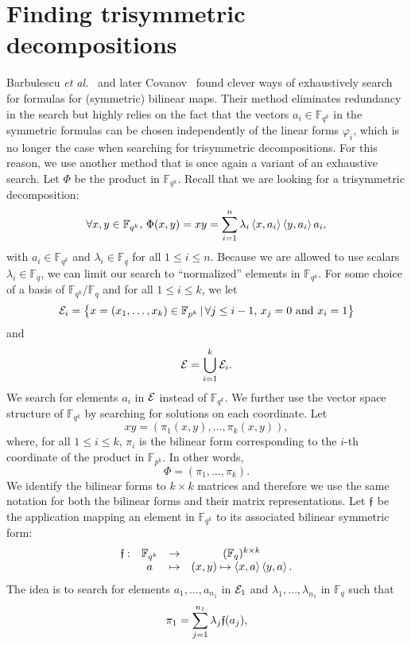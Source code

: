 \documentclass[11pt]{article}
\begin{document}
\section{Finding trisymmetric decompositions}
\label{sec:algos}
Barbulescu \emph{et al.}~\cite{BDEZ12} and later Covanov~\cite{Covanov19} found
clever ways of exhaustively search for formulas for (symmetric) bilinear maps.
Their method eliminates redundancy in the search but highly
relies on the fact that the vectors $a_i\in\mathbb{F}_{q^k}$ in%
the symmetric formulas
can be chosen independently of
the linear forms $\varphi_i$, which is no longer
the case when searching for trisymmetric decompositions. For this reason, we
use another method that is once again a variant of an exhaustive search. Let
$\Phi$ be the product in $\mathbb{F}_{q^k}$. Recall
that we are looking for a trisymmetric decomposition:
\[
  \forall x, y\in\mathbb{F}_{q^k},\,\Phi(x, y) = xy =
  \sum_{i=1}^{n}\lambda_i\left\langle x,a_i\right\rangle\left\langle y,a_i\right\rangle a_i,
\]
with $a_i\in\mathbb{F}_{q^k}$ and $\lambda_i\in\mathbb{F}_q$ for all $1\leq i
\leq n$. Because we are allowed to use scalars $\lambda_i\in\mathbb{F}_q$, we
can limit our search to ``normalized'' elements in $\mathbb{F}_{q^k}$. For some
choice of a basis of $\mathbb{F}_{q^k}/\mathbb{F}_q$ and for all
$1\leq i\leq k$, we let
\[
  \mathcal{E}_i=\left\{ x=(x_1, \dots, x_k)\in\mathbb{F}_{p^k}
  \,|\, \forall j\leq i-1,\,x_j=0\text{ and }x_i=1 \right\}
\]
and
\[
  \mathcal{E} = \bigcup_{i=1}^k\mathcal{E}_i.
\]
We search for elements $a_i$ in $\mathcal{E}$ instead of $\mathbb{F}_{q^k}$. We further
use the vector space structure of $\mathbb{F}_{q^k}$ by searching for solutions
on each coordinate.
Let 
\[
  xy = (\pi_1(x, y), \dots, \pi_k(x, y)),
\]
where, for all $1\leq i\leq k$, $\pi_i$ is the bilinear form corresponding to
the $i$-th coordinate of the product in $\mathbb{F}_{p^k}$. In other words, 
\[
  \Phi = (\pi_1, \dots, \pi_k).
\]
We identify the
bilinear forms to $k\times k$ matrices and therefore we use the same notation for both the
bilinear forms and their matrix representations. Let $\mathfrak{f}$ be the application mapping an element in
$\mathbb{F}_{q^k}$ to its associated bilinear symmetric form:
\[
\begin{array}{cccc}
  \mathfrak{f}: & \mathbb{F}_{q^k} & \to & (\mathbb{F}_q)^{k\times k} \\
  & a & \mapsto & (x, y)\mapsto \left\langle x,a\right\rangle\left\langle y,a\right\rangle.
\end{array}
\]
The idea is to search for elements $a_1, \dots, a_{n_1}$ in $\mathcal{E}_1$ and
$\lambda_1, \dots, \lambda_{n_1}$ in $\mathbb{F}_q$ such that 
\begin{equation}
  \pi_1 = \sum_{j=1}^{n_1}\lambda_j\mathfrak{f}(a_j),
  \label{eq:pi1}
\end{equation}
\end{document}
